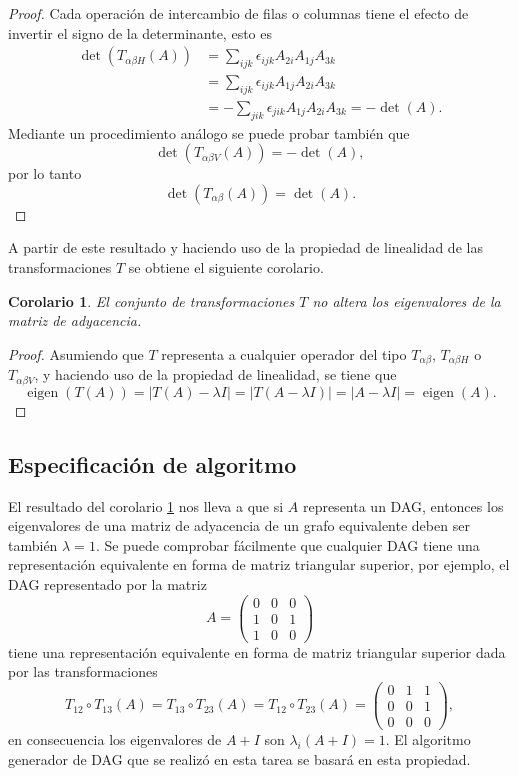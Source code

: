 \documentclass[10pt,a4paper]{article}
\newtheorem{corolario}{Corolario}[teorema1]
\begin{document}
\begin{proof}
Cada operación de intercambio de filas o columnas tiene el efecto de invertir el signo de la determinante, esto es
\begin{align*}
	\operatorname{det}\left( T_{\alpha \beta H}(A) \right) &= \sum_{ijk} \epsilon_{ijk} A_{2i} A_{1j} A_{3k} \\
	&= \sum_{ijk} \epsilon_{ijk} A_{1j} A_{2i} A_{3k} \\
	&= - \sum_{jik} \epsilon_{jik} A_{1j} A_{2i} A_{3k} = - \operatorname{det}(A).
\end{align*}
Mediante un procedimiento análogo se puede probar también que
\[
	\operatorname{det}\left( T_{\alpha \beta V}(A) \right) = - \operatorname{det}(A),
\]
por lo tanto
\[
	\operatorname{det}(T_{\alpha \beta} (A)) = \operatorname{det}(A).
\]

\end{proof}
A partir de este resultado y haciendo uso de la propiedad de linealidad de las transformaciones $T$ se obtiene el siguiente corolario.
\begin{corolario}
\label{cor1}
El conjunto de transformaciones $T$ no altera los eigenvalores de la matriz de adyacencia.
\end{corolario}
\begin{proof}
Asumiendo que $T$ representa a cualquier operador del tipo $T_{\alpha \beta}$, $T_{\alpha \beta H}$ o $T_{\alpha \beta V}$, y haciendo uso de la propiedad de linealidad, se tiene que
\[
	\operatorname{eigen}(T(A)) = |T(A) - \lambda I| = |T(A-\lambda I)| = |A-\lambda I| = \operatorname{eigen}(A).
\]
\end{proof}

\subsection{Especificación de algoritmo}
El resultado del corolario \ref{cor1} nos lleva a que si $A$ representa un DAG, entonces los eigenvalores de una matriz de adyacencia de un grafo equivalente deben ser también $\lambda = 1$. Se puede comprobar fácilmente que cualquier DAG tiene una representación equivalente en forma de matriz triangular superior, por ejemplo, el DAG representado por la matriz
\[
	A = \begin{pmatrix}
		0 & 0 & 0 \\
		1 & 0 & 1 \\
		1 & 0 & 0
	\end{pmatrix}
\]
tiene una representación equivalente en forma de matriz triangular superior dada por las transformaciones
\[
	T_{12} \circ T_{13} (A) = T_{13} \circ T_{23} (A) = T_{12} \circ T_{23} (A) = \begin{pmatrix}
		0 & 1 & 1 \\
		0 & 0 & 1 \\
		0 & 0 & 0
	\end{pmatrix},
\]
en consecuencia los eigenvalores de $A+I$ son $\lambda_i (A+I) = 1$.
El algoritmo generador de DAG que se realizó en esta tarea se basará en esta propiedad.
\end{document}
